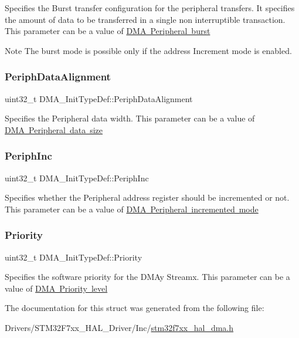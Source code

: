 Specifies the Burst transfer configuration for the peripheral transfers. It specifies the amount of data to be transferred in a single non interruptible transaction. This parameter can be a value of \mbox{\hyperlink{group___d_m_a___peripheral__burst}{D\+MA Peripheral burst}} \begin{DoxyNote}{Note}
The burst mode is possible only if the address Increment mode is enabled. 
\end{DoxyNote}
\mbox{\label{struct_d_m_a___init_type_def_a10a4a549953efa20c235dcbb381b6f0b}} 
\subsubsection{\texorpdfstring{PeriphDataAlignment}{PeriphDataAlignment}}
{\footnotesize\ttfamily uint32\+\_\+t D\+M\+A\+\_\+\+Init\+Type\+Def\+::\+Periph\+Data\+Alignment}

Specifies the Peripheral data width. This parameter can be a value of \mbox{\hyperlink{group___d_m_a___peripheral__data__size}{D\+MA Peripheral data size}} \mbox{\label{struct_d_m_a___init_type_def_a46811eb656170cb5c542054d1a41db3a}} 
\subsubsection{\texorpdfstring{PeriphInc}{PeriphInc}}
{\footnotesize\ttfamily uint32\+\_\+t D\+M\+A\+\_\+\+Init\+Type\+Def\+::\+Periph\+Inc}

Specifies whether the Peripheral address register should be incremented or not. This parameter can be a value of \mbox{\hyperlink{group___d_m_a___peripheral__incremented__mode}{D\+MA Peripheral incremented mode}} \mbox{\label{struct_d_m_a___init_type_def_af110cc02c840207930e3c0e5de5d7dc4}} 
\subsubsection{\texorpdfstring{Priority}{Priority}}
{\footnotesize\ttfamily uint32\+\_\+t D\+M\+A\+\_\+\+Init\+Type\+Def\+::\+Priority}

Specifies the software priority for the D\+M\+Ay Streamx. This parameter can be a value of \mbox{\hyperlink{group___d_m_a___priority__level}{D\+MA Priority level}} 

The documentation for this struct was generated from the following file\+:\begin{DoxyCompactItemize}
\item 
Drivers/\+S\+T\+M32\+F7xx\+\_\+\+H\+A\+L\+\_\+\+Driver/\+Inc/\mbox{\hyperlink{stm32f7xx__hal__dma_8h}{stm32f7xx\+\_\+hal\+\_\+dma.\+h}}\end{DoxyCompactItemize}
